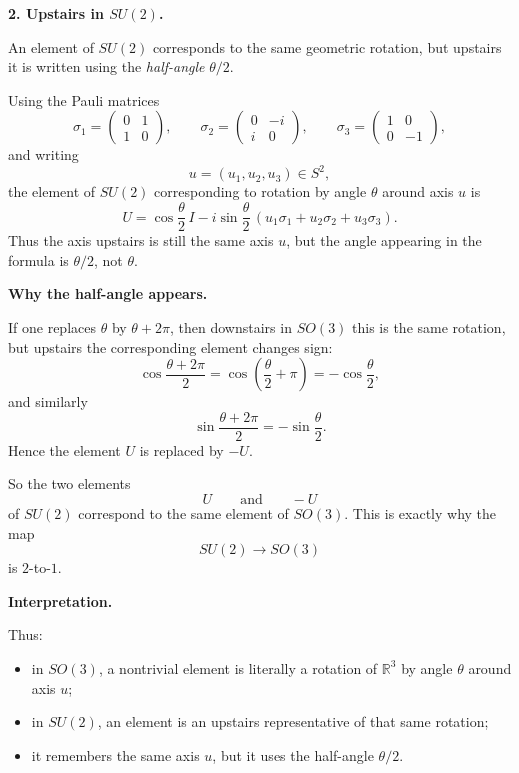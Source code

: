 \documentclass[12pt,a4paper]{article}
\theoremstyle{notespace}
\begin{document}
\medskip

\textbf{2. Upstairs in \(SU(2)\).}

An element of \(SU(2)\) corresponds to the same geometric rotation, but upstairs it is written using the \emph{half-angle} \(\theta/2\).

Using the Pauli matrices
\[
\sigma_1=
\begin{pmatrix}
	0&1\\
	1&0
\end{pmatrix},
\qquad
\sigma_2=
\begin{pmatrix}
	0&-i\\
	i&0
\end{pmatrix},
\qquad
\sigma_3=
\begin{pmatrix}
	1&0\\
	0&-1
\end{pmatrix},
\]
and writing
\[
u=(u_1,u_2,u_3)\in S^2,
\]
the element of \(SU(2)\) corresponding to rotation by angle \(\theta\) around axis \(u\) is
\[
U
=
\cos\frac{\theta}{2}\,I
-
i\sin\frac{\theta}{2}\,(u_1\sigma_1+u_2\sigma_2+u_3\sigma_3).
\]
Thus the axis upstairs is still the same axis \(u\), but the angle appearing in the formula is \(\theta/2\), not \(\theta\).

\medskip

\textbf{Why the half-angle appears.}

If one replaces \(\theta\) by \(\theta+2\pi\), then downstairs in \(SO(3)\) this is the same rotation, but upstairs the corresponding element changes sign:
\[
\cos\frac{\theta+2\pi}{2}
=
\cos\left(\frac{\theta}{2}+\pi\right)
=
-\cos\frac{\theta}{2},
\]
and similarly
\[
\sin\frac{\theta+2\pi}{2}
=
-\sin\frac{\theta}{2}.
\]
Hence the element \(U\) is replaced by \(-U\).

So the two elements
\[
U\qquad\text{and}\qquad -U
\]
of \(SU(2)\) correspond to the same element of \(SO(3)\). This is exactly why the map
\[
SU(2)\to SO(3)
\]
is \(2\)-to-\(1\).

\medskip

\textbf{Interpretation.}

Thus:

\begin{itemize}
	\item in \(SO(3)\), a nontrivial element is literally a rotation of \(\mathbb R^3\) by angle \(\theta\) around axis \(u\);
	\item in \(SU(2)\), an element is an upstairs representative of that same rotation;
	\item it remembers the same axis \(u\), but it uses the half-angle \(\theta/2\).
\end{itemize}
\end{document}
